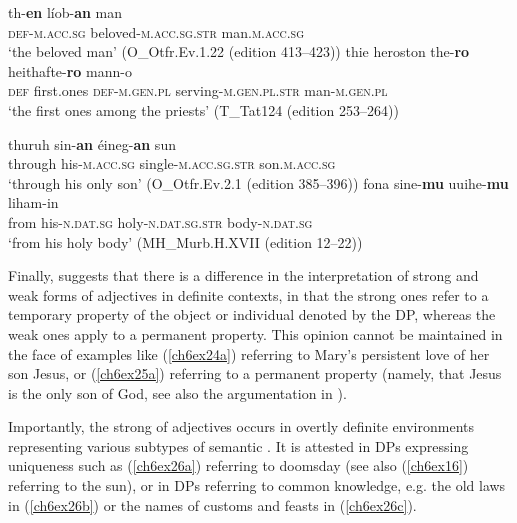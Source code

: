 \documentclass[output=paper,colorlinks,citecolor=brown]{langscibook}
\begin{document}
\begin{exe}
\ex\label{ch6ex24}\begin{xlist}
\ex\label{ch6ex24a}
\gll th-\textbf{en} líob-\textbf{an} man\\
\textsc{def-m.acc.sg} beloved-\textsc{m.acc.sg.str} man.\textsc{m.acc.sg}\\
\glt `the beloved man' (O\_Otfr.Ev.1.22 (edition 413--423))
\ex\label{ch6ex24b} 
\gll thie heroston the-\textbf{ro} heithafte-\textbf{ro} mann-o\\
\textsc{def} first.ones \textsc{def-m.gen.pl} serving-\textsc{m.gen.pl.str} man-\textsc{m.gen.pl}\\
\glt `the first ones among the priests' (T\_Tat124 (edition 253--264))
\end{xlist}
\end{exe}

\begin{exe}
\ex\label{ch6ex25}\begin{xlist}
\ex\label{ch6ex25a}
\gll thuruh sin-\textbf{an } éineg-\textbf{an} sun\\
through his-\textsc{m.acc.sg} single-\textsc{m.acc.sg.str} son.\textsc{m.acc.sg}\\
\glt `through his only son' (O\_Otfr.Ev.2.1 (edition 385--396))
\ex\label{ch6ex25b} 
\gll fona sine-\textbf{mu} uuihe-\textbf{mu } liham-in\\
from his-\textsc{n.dat.sg} holy-\textsc{n.dat.sg.str} body-\textsc{n.dat.sg}\\
\glt `from his holy body' (MH\_Murb.H.XVII (edition 12--22))
\end{xlist}
\end{exe}

Finally, \citet[289, Anm. 1]{Braune2018AHD} suggests that there is a difference in the
interpretation of strong and weak forms of adjectives in definite
contexts, in that the strong ones refer to a temporary property of the
object or individual denoted by the DP, whereas the weak ones apply to a
permanent property. This opinion cannot be maintained in the face of
examples like (\ref{ch6ex24a}) referring to Mary's persistent love of her son
Jesus, or (\ref{ch6ex25a}) referring to a permanent property (namely, that Jesus is
the only son of God, see also the argumentation in \cite[750--751]{Wilmanns09}).

Importantly, the strong  of adjectives occurs in overtly
definite environments representing various subtypes of semantic
. It is attested in DPs expressing uniqueness such as (\ref{ch6ex26a})
referring to doomsday (see also (\ref{ch6ex16}) referring to the sun), or in DPs
referring to common knowledge, e.g. the old laws in (\ref{ch6ex26b}) or the names
of customs and feasts in (\ref{ch6ex26c}).
\end{document}
